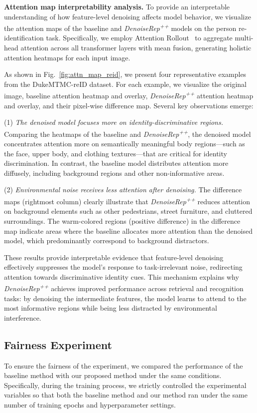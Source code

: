 \documentclass[conference]{IEEEtran}
\begin{document}
{{\color{red}
\textbf{Attention map interpretability analysis.}
To provide an interpretable understanding of how feature-level denoising affects model behavior, we visualize the attention maps of the baseline and \textit{DenoiseRep\textsuperscript{++}} models on the person re-identification task. Specifically, we employ Attention Rollout~\cite{abnar2020quantifying} to aggregate multi-head attention across all transformer layers with mean fusion, generating holistic attention heatmaps for each input image.

As shown in Fig.~\ref{fig:attn_map_reid}, we present four representative examples from the DukeMTMC-reID dataset. For each example, we visualize the original image, baseline attention heatmap and overlay, \textit{DenoiseRep\textsuperscript{++}} attention heatmap and overlay, and their pixel-wise difference map. Several key observations emerge:

(1) \textit{The denoised model focuses more on identity-discriminative regions.} Comparing the heatmaps of the baseline and \textit{DenoiseRep\textsuperscript{++}}, the denoised model concentrates attention more on semantically meaningful body regions—such as the face, upper body, and clothing textures—that are critical for identity discrimination. In contrast, the baseline model distributes attention more diffusely, including background regions and other non-informative areas.

(2) \textit{Environmental noise receives less attention after denoising.} The difference maps (rightmost column) clearly illustrate that \textit{DenoiseRep\textsuperscript{++}} reduces attention on background elements such as other pedestrians, street furniture, and cluttered surroundings. The warm-colored regions (positive difference) in the difference map indicate areas where the baseline allocates more attention than the denoised model, which predominantly correspond to background distractors.

These results provide interpretable evidence that feature-level denoising effectively suppresses the model's response to task-irrelevant noise, redirecting attention towards discriminative identity cues. This mechanism explains why \textit{DenoiseRep\textsuperscript{++}} achieves improved performance across retrieval and recognition tasks: by denoising the intermediate features, the model learns to attend to the most informative regions while being less distracted by environmental interference.
}%


\subsection{Fairness Experiment}
To ensure the fairness of the experiment, we compared the performance of the baseline method with our proposed method under the same conditions. Specifically, during the training process, we strictly controlled the experimental variables so that both the baseline method and our method ran under the same number of training epochs and hyperparameter settings. 

}
\end{document}
